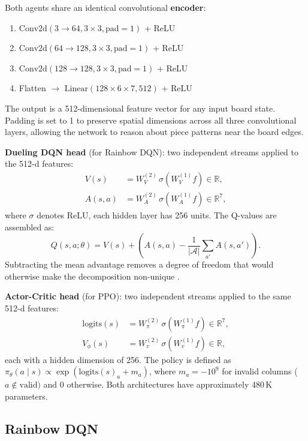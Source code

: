 \documentclass[10pt, letterpaper, twocolumn]{article}
\newcommand{\R}{\mathbb{R}}
\newcommand{\calA}{\mathcal{A}}
\begin{document}
Both agents share an identical convolutional \textbf{encoder}:
\begin{enumerate}
  \item $\text{Conv2d}(3 \to 64, 3{\times}3, \text{pad}=1)$ + ReLU
  \item $\text{Conv2d}(64 \to 128, 3{\times}3, \text{pad}=1)$ + ReLU
  \item $\text{Conv2d}(128 \to 128, 3{\times}3, \text{pad}=1)$ + ReLU
  \item Flatten $\to$ $\text{Linear}(128 \times 6 \times 7, 512)$ + ReLU
\end{enumerate}
The output is a 512-dimensional feature vector for any input board state.
Padding is set to 1 to preserve spatial dimensions across all three
convolutional layers, allowing the network to reason about piece patterns
near the board edges.

\textbf{Dueling DQN head} (for Rainbow DQN): two independent streams
applied to the 512-d features:
\begin{align}
  V(s)    &= W_V^{(2)}\,\sigma(W_V^{(1)} f) \in \R, \\
  A(s, a) &= W_A^{(2)}\,\sigma(W_A^{(1)} f) \in \R^7,
\end{align}
where $\sigma$ denotes ReLU, each hidden layer has 256 units.  The
Q-values are assembled as:
\begin{equation}
  Q(s,a;\theta) = V(s) + \left(A(s,a) -
    \frac{1}{|\calA|}\sum_{a'} A(s,a')\right).
  \label{eq:dueling}
\end{equation}
Subtracting the mean advantage removes a degree of freedom that would
otherwise make the decomposition non-unique \citep{wang2016dueling}.

\textbf{Actor-Critic head} (for PPO): two independent streams applied to
the same 512-d features:
\begin{align}
  \text{logits}(s)    &= W_\pi^{(2)}\,\sigma(W_\pi^{(1)} f) \in \R^7, \\
  V_\phi(s)           &= W_v^{(2)}\,\sigma(W_v^{(1)} f) \in \R,
\end{align}
each with a hidden dimension of 256.  The policy is defined as
$\pi_\theta(a \mid s) \propto \exp(\text{logits}(s)_a + m_a)$, where $m_a
= -10^9$ for invalid columns ($a \notin \text{valid})$ and $0$ otherwise.
Both architectures have approximately 480\,K parameters.

\subsection{Rainbow DQN}
\label{sec:dqn}
\end{document}
